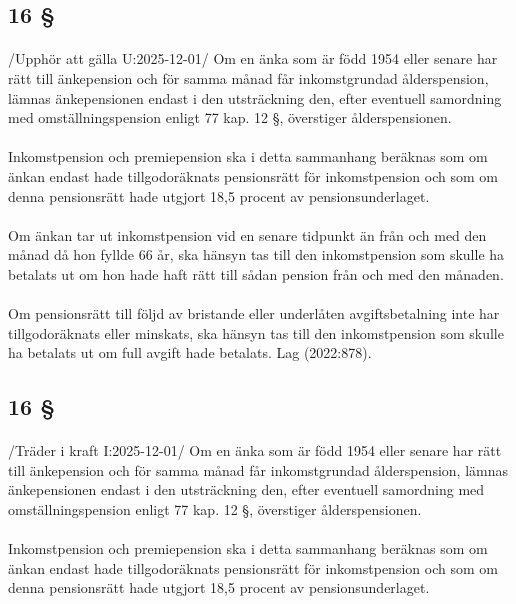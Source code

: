 \documentclass[a4paper,notitlepage,openany,10pt]{book}
\begin{document}
\subsection*{16 §}
\paragraph*{}
/Upphör att gälla U:2025-12-01/
Om en änka som är född 1954 eller senare har rätt till änkepension och för samma månad får inkomstgrundad ålderspension, lämnas änkepensionen endast i den utsträckning den, efter eventuell samordning med omställningspension enligt 77 kap. 12 §, överstiger ålderspensionen.
\paragraph*{}
Inkomstpension och premiepension ska i detta sammanhang beräknas som om änkan endast hade tillgodoräknats pensionsrätt för inkomstpension och som om denna pensionsrätt hade utgjort 18,5 procent av pensionsunderlaget.
\paragraph*{}
Om änkan tar ut inkomstpension vid en senare tidpunkt än från och med den månad då hon fyllde 66 år, ska hänsyn tas till den inkomstpension som skulle ha betalats ut om hon hade haft rätt till sådan pension från och med den månaden.
\paragraph*{}
Om pensionsrätt till följd av bristande eller underlåten avgiftsbetalning inte har tillgodoräknats eller minskats, ska hänsyn tas till den inkomstpension som skulle ha betalats ut om full avgift hade betalats.
Lag (2022:878).
\subsection*{16 §}
\paragraph*{}
/Träder i kraft I:2025-12-01/
Om en änka som är född 1954 eller senare har rätt till änkepension och för samma månad får inkomstgrundad ålderspension, lämnas änkepensionen endast i den utsträckning den, efter eventuell samordning med omställningspension enligt 77 kap. 12 §, överstiger ålderspensionen.
\paragraph*{}
Inkomstpension och premiepension ska i detta sammanhang beräknas som om änkan endast hade tillgodoräknats pensionsrätt för inkomstpension och som om denna pensionsrätt hade utgjort 18,5 procent av pensionsunderlaget.
\end{document}
